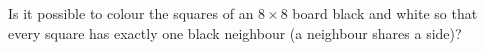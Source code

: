 Is it possible to colour the squares of an $8\times8$ board black and white so that every square has exactly one black neighbour (a neighbour shares a side)?
